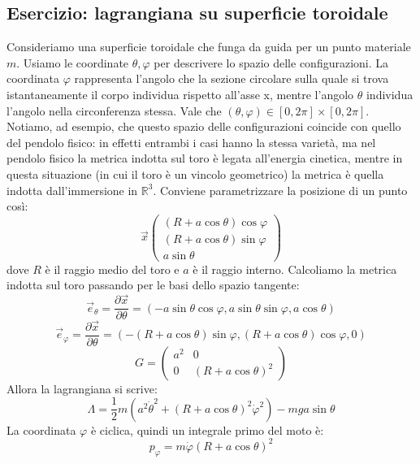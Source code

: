 \documentclass[a4paper,openany]{article}
\begin{document}
	\subsection{Esercizio: lagrangiana su superficie toroidale}
	Consideriamo una superficie toroidale che funga da guida per un punto materiale $m$. Usiamo le coordinate $\theta,\varphi$ per descrivere lo spazio delle configurazioni. La coordinata $\varphi$ rappresenta l'angolo che la sezione circolare sulla quale si trova istantaneamente il corpo individua rispetto all'asse x, mentre l'angolo $\theta$ individua l'angolo nella circonferenza stessa. Vale che $(\theta,\varphi) \in [0,2\pi]\times[0,2\pi]$. Notiamo, ad esempio, che questo spazio delle configurazioni coincide con quello del pendolo fisico: in effetti entrambi i casi hanno la stessa varietà, ma nel pendolo fisico la metrica indotta sul toro è legata all'energia cinetica, mentre in questa situazione (in cui il toro è un vincolo geometrico) la metrica è quella indotta dall'immersione in $\mathbb{R}^{3}$. Conviene parametrizzare la posizione di un punto così:
	\begin{equation}\label{key}
		\vec{x}
		\begin{pmatrix}
			(R+a\cos\theta)\cos\varphi \\
			(R+a\cos\theta)\sin\varphi \\
			a\sin\theta
		\end{pmatrix}
	\end{equation}
	dove $R$ è il raggio medio del toro e $a$ è il raggio interno. Calcoliamo la metrica indotta sul toro passando per le basi dello spazio tangente:
	$$
	\vec{e}_{\theta} = \dfrac{\partial \vec{x}}{\partial \theta} = (-a\sin\theta\cos\varphi, a\sin\theta\sin\varphi, a\cos\theta)
	$$
	$$
	\vec{e}_{\varphi} = \dfrac{\partial \vec{x}}{\partial \theta} = (-(R+a\cos\theta)\sin\varphi, (R+a\cos\theta)\cos\varphi, 0)
	$$
	\begin{equation}\label{key}
		G = 
		\begin{pmatrix}
			a^2 & 0 \\
			0 & (R+a\cos\theta)^2 
		\end{pmatrix}
	\end{equation}
	Allora la lagrangiana si scrive:
	\begin{equation}\label{key}
		\Lambda = \dfrac{1}{2}m(a^{2}\dot{\theta}^{2}+(R+a\cos\theta)^{2}\dot{\varphi}^{2}) - mga\sin\theta
	\end{equation}
	La coordinata $\varphi$ è ciclica, quindi un integrale primo del moto è:
	$$
	p_{\varphi} = m\dot{\varphi}(R+a\cos\theta)^{2}
	$$
\end{document}
